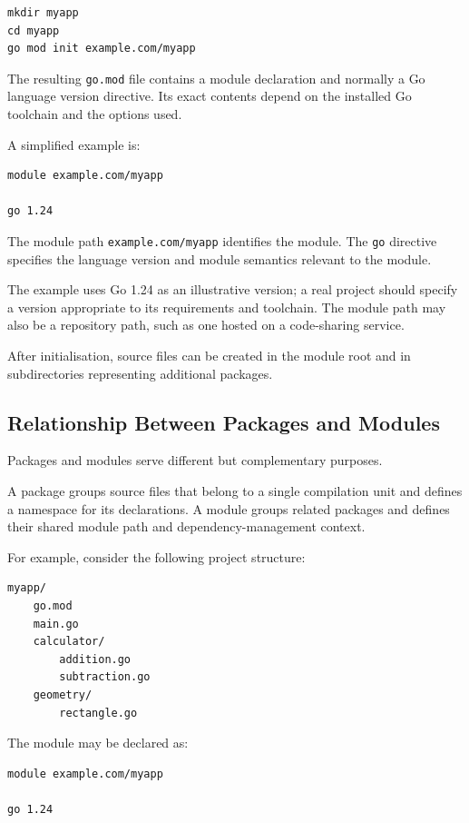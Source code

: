 \begin{lstlisting}
mkdir myapp
cd myapp
go mod init example.com/myapp
\end{lstlisting}

The resulting \texttt{go.mod} file contains a module declaration and normally a Go language version directive. Its exact contents depend on the installed Go toolchain and the options used.

A simplified example is:

\begin{lstlisting}
module example.com/myapp

go 1.24
\end{lstlisting}

The module path \texttt{example.com/myapp} identifies the module. The \texttt{go} directive specifies the language version and module semantics relevant to the module.

The example uses Go 1.24 as an illustrative version; a real project should specify a version appropriate to its requirements and toolchain. The module path may also be a repository path, such as one hosted on a code-sharing service.

After initialisation, source files can be created in the module root and in subdirectories representing additional packages.

\subsection{Relationship Between Packages and Modules}

Packages and modules serve different but complementary purposes.

A package groups source files that belong to a single compilation unit and defines a namespace for its declarations. A module groups related packages and defines their shared module path and dependency-management context.

For example, consider the following project structure:

\begin{lstlisting}
myapp/
    go.mod
    main.go
    calculator/
        addition.go
        subtraction.go
    geometry/
        rectangle.go
\end{lstlisting}

The module may be declared as:

\begin{lstlisting}
module example.com/myapp

go 1.24
\end{lstlisting}

